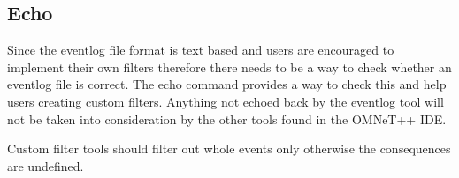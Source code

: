 \subsection{Echo}
Since the eventlog file format is text based and users are encouraged to implement their
own filters therefore there needs to be a way to check whether an eventlog file is
correct. The echo command provides a way to check this and help users creating custom
filters. Anything not echoed back by the eventlog tool will not be taken into
consideration by the other tools found in the OMNeT++ IDE.
\begin{note}
Custom filter tools should filter out whole events only otherwise the consequences are
undefined.
\end{note}

